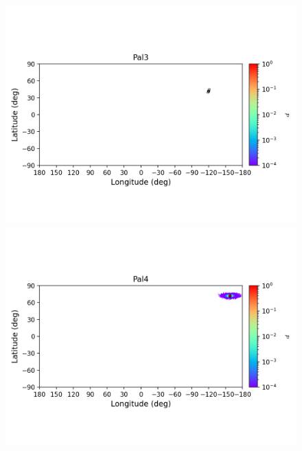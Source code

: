         \begin{figure}
            \begin{center}
                \includegraphics[clip=true, trim = 0mm 20mm 0mm 10mm, width=1\columnwidth]{images/error_plots_Pal3.png}
                \includegraphics[clip=true, trim = 0mm 20mm 0mm 10mm, width=1\columnwidth]{images/error_plots_Pal4.png}
                

\end{center}
\end{figure}
